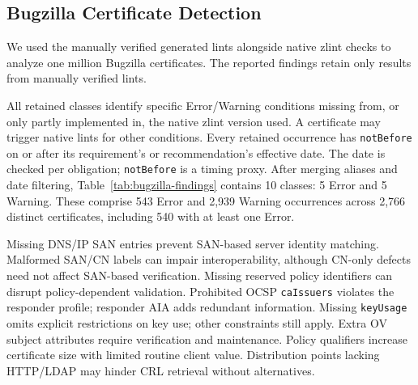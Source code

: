 \subsection{Bugzilla Certificate Detection}
\label{subsec:certdetect}

We used the manually verified generated lints alongside native zlint checks
to analyze one million Bugzilla certificates. The reported findings retain
only results from manually verified lints.

All retained classes identify specific Error/Warning conditions missing
from, or only partly implemented in, the native zlint version used.
A certificate may trigger native lints for other conditions. Every retained
occurrence has \texttt{notBefore} on or after its requirement's or
recommendation's effective date.
The date is checked per obligation; \texttt{notBefore} is a timing proxy.
After merging aliases and date filtering, Table~\ref{tab:bugzilla-findings}
contains 10 classes: 5 Error and 5 Warning. These comprise 543 Error and
2,939 Warning occurrences across 2,766 distinct certificates, including 540
with at least one Error. 

Missing DNS/IP SAN entries prevent SAN-based server identity matching.
Malformed SAN/CN labels can impair interoperability, although CN-only defects
need not affect SAN-based verification. Missing reserved policy identifiers
can disrupt policy-dependent validation. Prohibited OCSP \texttt{caIssuers}
violates the responder profile; responder AIA adds redundant information.
Missing \texttt{keyUsage} omits explicit restrictions on key use; other
constraints still apply. Extra OV subject attributes require verification
and maintenance. Policy qualifiers increase certificate size with limited
routine client value. Distribution points lacking HTTP/LDAP may hinder CRL
retrieval without alternatives.

